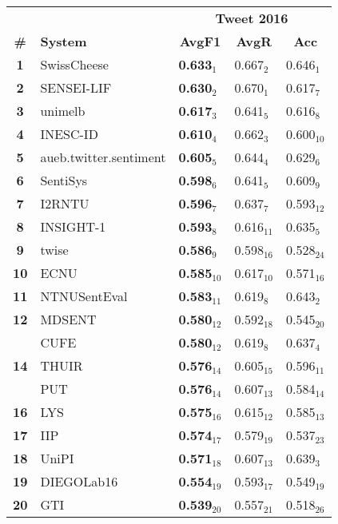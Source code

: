 \begin{table*}[tbh]
\centering
\begin{small}
\renewcommand{\arraystretch}{1.0}%
\begin{tabular}{|c|l|l|l|l|}
\hline
 & & \multicolumn{3}{c|}{\bf Tweet 2016} \\
   \bf \# & \bf System & \multicolumn{1}{c}{\bf AvgF1} & \multicolumn{1}{c}{\bf AvgR} & \multicolumn{1}{c|}{\bf Acc} \\
\hline
\bf 1 & SwissCheese & \bf 0.633$_{1}$ & 0.667$_{2}$ & 0.646$_{1}$ \\
\bf 2 & SENSEI-LIF & \bf 0.630$_{2}$ & 0.670$_{1}$ & 0.617$_{7}$ \\
\bf 3 & unimelb & \bf 0.617$_{3}$ & 0.641$_{5}$ & 0.616$_{8}$ \\
\bf 4 & INESC-ID & \bf 0.610$_{4}$ & 0.662$_{3}$ & 0.600$_{10}$ \\
\bf 5 & aueb.twitter.sentiment & \bf 0.605$_{5}$ & 0.644$_{4}$ & 0.629$_{6}$ \\
\bf 6 & SentiSys & \bf 0.598$_{6}$ & 0.641$_{5}$ & 0.609$_{9}$ \\
\bf 7 & I2RNTU & \bf 0.596$_{7}$ & 0.637$_{7}$ & 0.593$_{12}$ \\
\bf 8 & INSIGHT-1 & \bf 0.593$_{8}$ & 0.616$_{11}$ & 0.635$_{5}$ \\
\bf 9 & twise & \bf 0.586$_{9}$ & 0.598$_{16}$ & 0.528$_{24}$ \\
\bf 10 & ECNU & \bf 0.585$_{10}$ & 0.617$_{10}$ & 0.571$_{16}$ \\
\bf 11 & NTNUSentEval & \bf 0.583$_{11}$ & 0.619$_{8}$ & 0.643$_{2}$ \\
\bf 12 & MDSENT & \bf 0.580$_{12}$ & 0.592$_{18}$ & 0.545$_{20}$ \\
& CUFE & \bf 0.580$_{12}$ & 0.619$_{8}$ & 0.637$_{4}$ \\
\bf 14 & THUIR & \bf 0.576$_{14}$ & 0.605$_{15}$ & 0.596$_{11}$ \\
& PUT & \bf 0.576$_{14}$ & 0.607$_{13}$ & 0.584$_{14}$ \\
\bf 16 & LYS & \bf 0.575$_{16}$ & 0.615$_{12}$ & 0.585$_{13}$ \\
\bf 17 & IIP & \bf 0.574$_{17}$ & 0.579$_{19}$ & 0.537$_{23}$ \\
\bf 18 & UniPI & \bf 0.571$_{18}$ & 0.607$_{13}$ & 0.639$_{3}$ \\
\bf 19 & DIEGOLab16 & \bf 0.554$_{19}$ & 0.593$_{17}$ & 0.549$_{19}$ \\
\bf 20 & GTI & \bf 0.539$_{20}$ & 0.557$_{21}$ & 0.518$_{26}$ \\

\end{tabular}
\end{small}
\end{table*}
